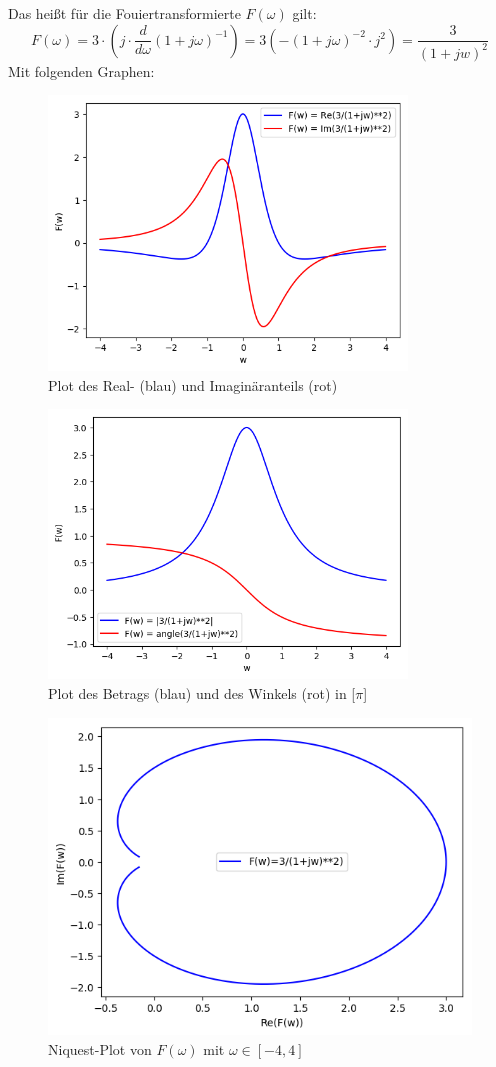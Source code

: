 		Das heißt für die Fouiertransformierte $F(\omega)$ gilt:
		$$F(\omega) = 3\cdot \left(j\cdot \frac{d}{d\omega}\left(1+j\omega\right)^{-1}\right) = 3\left(-\left(1+j\omega\right)^{-2}\cdot j^2\right) = \frac{3}{(1+jw)^2}$$
		Mit folgenden Graphen:\\
		\begin{figure}[h]
			\centering
			\caption{Plot des Real- (blau) und Imaginäranteils (rot)}
			\includegraphics[width = 0.85\textwidth]{A29_plot-real-imag.png}
		\end{figure}
		\begin{figure}[h]
			\centering
			\caption{Plot des Betrags (blau) und des Winkels (rot) in [$\pi$]}
			\includegraphics[width= 0.85\textwidth]{A29_plot-abs-angle.png}
		\end{figure}
		\begin{figure}
			\centering
			\caption{Niquest-Plot von $F(\omega)$ mit $\omega\in[-4,4]$}
			\includegraphics[width=\textwidth]{A29_niquest-plot.png}
		\end{figure}
